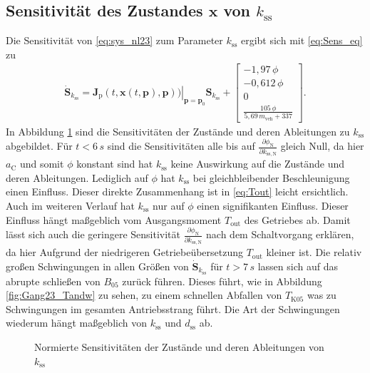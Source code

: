 \subsection{Sensitivität des Zustandes $\pmb{x}$ von $k_\mathrm{ss}$}
Die Sensitivität von \eqref{eq:sys_nl23} zum Parameter $k_\mathrm{ss}$ ergibt sich mit \eqref{eq:Sens_eq} zu 
\begin{align}
\dot{\pmb{S}}_{k_\mathrm{ss}} = \left. \pmb{J}_\mathrm{p}(t,\pmb{x}(t,\pmb{p}),\pmb{p}))\right|_{\pmb{p}=\pmb{p}_0} \pmb{S}_{k_\mathrm{ss}} 
+ \begin{bmatrix} -1,97\,\phi \\ -0,612\,\phi \\ 0 \\ \frac{105\,\phi}{5,69\,m_\mathrm{veh} + 337} \end{bmatrix}.
\end{align}
In Abbildung \ref{fig:Sens_k} sind die Sensitivitäten der Zustände und deren Ableitungen zu $k_\mathrm{ss}$ abgebildet. Für $t<6\,s$ sind die Sensitivitäten alle bis auf $\frac{\partial \phi_\mathrm{N}}{\partial k_\mathrm{ss,N}}$ gleich Null, da hier $a_\mathrm{C}$ und somit $\phi$ konstant sind hat $k_\mathrm{ss}$ keine Auswirkung auf die Zustände und deren Ableitungen. Lediglich auf $\phi$ hat $k_\mathrm{ss}$ bei gleichbleibender Beschleunigung einen Einfluss. Dieser direkte Zusammenhang ist in \eqref{eq:Tout} leicht ersichtlich. Auch im weiteren Verlauf hat $k_\mathrm{ss}$ nur auf $\phi$ einen signifikanten Einfluss. Dieser Einfluss hängt maßgeblich vom Ausgangsmoment $T_\mathrm{out}$ des Getriebes ab. Damit lässt sich auch die geringere Sensitivität $\frac{\partial \phi_\mathrm{N}}{\partial k_\mathrm{ss,N}}$ nach dem Schaltvorgang erklären, da hier Aufgrund der niedrigeren Getriebeübersetzung $T_\mathrm{out}$ kleiner ist. Die relativ großen Schwingungen in allen Größen von $\dot{\pmb{S}}_{k_\mathrm{ss}}$ für $t>7\,s$ lassen sich auf das abrupte schließen von $B_{05}$ zurück führen. Dieses führt, wie in Abbildung \ref{fig:Gang23_Tandw} zu sehen, zu einem schnellen Abfallen von $T_\mathrm{K05}$ was zu Schwingungen im gesamten Antriebsstrang führt. Die Art der Schwingungen wiederum hängt maßgeblich von $k_\mathrm{ss}$ und $d_\mathrm{ss}$ ab. 

\begin{figure}
\centering
\newlength\kheight 
\setlength\kheight{8cm}
\newlength\kwidth 
\setlength\kwidth{13cm}

\caption{Normierte Sensitivitäten der Zustände und deren Ableitungen von $k_\mathrm{ss}$}
\label{fig:Sens_k}
\end{figure}


